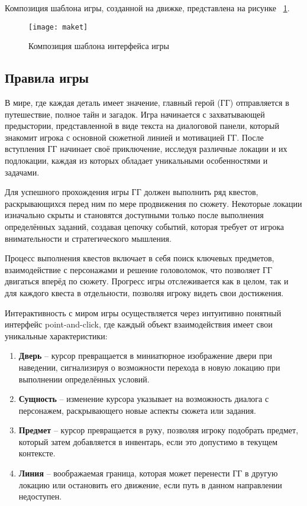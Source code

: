 Композиция шаблона игры, созданной на движке, представлена на рисунке ~\ref{maket:image}.

\begin{figure}[ht]
\texttt{[image: maket]}
\caption{Композиция шаблона интерфейса игры}
\label{maket:image}
\end{figure}

\subsection{Правила игры}

В мире, где каждая деталь имеет значение, главный герой (ГГ) отправляется в путешествие, полное тайн и загадок. Игра начинается с захватывающей предыстории, представленной в виде текста на диалоговой панели, который знакомит игрока с основной сюжетной линией и мотивацией ГГ. После вступления ГГ начинает своё приключение, исследуя различные локации и их подлокации, каждая из которых обладает уникальными особенностями и задачами.

Для успешного прохождения игры ГГ должен выполнить ряд квестов, раскрывающихся перед ним по мере продвижения по сюжету. Некоторые локации изначально скрыты и становятся доступными только после выполнения определённых заданий, создавая цепочку событий, которая требует от игрока внимательности и стратегического мышления.

Процесс выполнения квестов включает в себя поиск ключевых предметов, взаимодействие с персонажами и решение головоломок, что позволяет ГГ двигаться вперёд по сюжету. Прогресс игры отслеживается как в целом, так и для каждого квеста в отдельности, позволяя игроку видеть свои достижения.

Интерактивность с миром игры осуществляется через интуитивно понятный интерфейс point-and-click, где каждый объект взаимодействия имеет свои уникальные характеристики:

\begin{enumerate}
	\item \textbf{Дверь} – курсор превращается в миниатюрное изображение двери при наведении, сигнализируя о возможности перехода в новую локацию при выполнении определённых условий.
	\item \textbf{Сущность} – изменение курсора указывает на возможность диалога с персонажем, раскрывающего новые аспекты сюжета или задания.
	\item \textbf{Предмет} – курсор превращается в руку, позволяя игроку подобрать предмет, который затем добавляется в инвентарь, если это допустимо в текущем контексте.
	\item \textbf{Линия} – воображаемая граница, которая может перенести ГГ в другую локацию или остановить его движение, если путь в данном направлении недоступен.
\end{enumerate}

